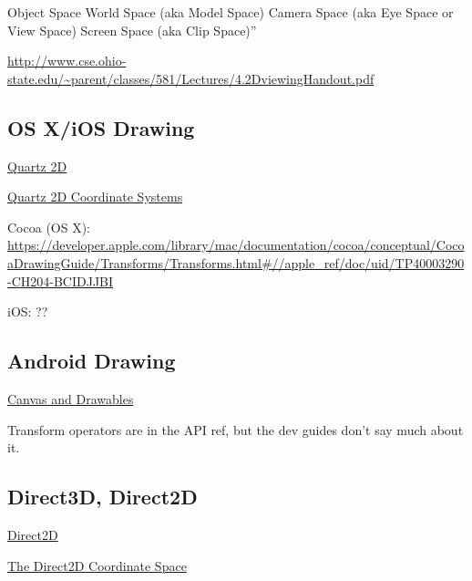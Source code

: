 \documentclass[12pt]{tufte-handout}
\numberwithin{equation}{subsection}
\numberwithin{equation}{subsection}
\begin{document}
\begin{appendices}
                Object Space
                World Space (aka Model Space)
                Camera Space (aka Eye Space or View Space)
                Screen Space (aka Clip Space)''

                \url{http://www.cse.ohio-state.edu/~parent/classes/581/Lectures/4.2DviewingHandout.pdf}

                \subsection{OS X/iOS Drawing}

                \href{https://developer.apple.com/library/mac/documentation/graphicsimaging/conceptual/drawingwithquartz2d/dq\_overview/dq\_overview.html}{Quartz 2D}

                \href{https://developer.apple.com/library/mac/documentation/graphicsimaging/conceptual/drawingwithquartz2d/dq\_overview/dq\_overview.html#//apple\_ref/doc/uid/TP30001066-CH202-CJBBAEEC}{Quartz 2D Coordinate Systems}

                Cocoa (OS X):  \url{https://developer.apple.com/library/mac/documentation/cocoa/conceptual/CocoaDrawingGuide/Transforms/Transforms.html#//apple\_ref/doc/uid/TP40003290-CH204-BCIDJJBI}

                iOS:  ??

                \subsection{Android Drawing}

                \href{http://developer.android.com/guide/topics/graphics/2d-graphics.html}{Canvas and Drawables}

                Transform operators are in the API ref, but the dev guides don't say much about it.

                \subsection{Direct3D, Direct2D}
                \label{subs:direct3d}


                \href{http://msdn.microsoft.com/en-us/library/dd370990%28VS.85%29.aspx}{Direct2D}

                  \href{http://msdn.microsoft.com/en-us/library/dd756655(v=vs.85).aspx#the_direct2d_coordinate_space}{The Direct2D Coordinate Space}


\end{appendices}
\end{document}
